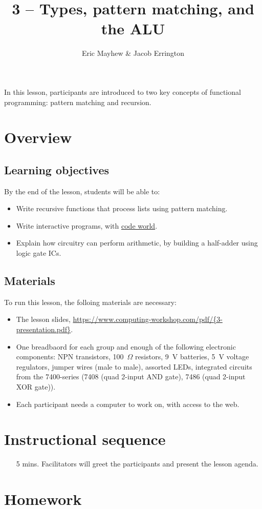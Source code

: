 \documentclass[11pt]{article}
\title{3 -- Types, pattern matching, and the ALU}
\author{Eric Mayhew \& Jacob Errington}
\date{}
\newcommand{\cwurl}{https://www.computing-workshop.com/}
\newcommand{\cwpdf}{\cwurl pdf/}
\newcommand{\codeworld}{\href{http://code.world/}{code world}}
\begin{document}
\maketitle

In this lesson, participants are introduced to two key concepts of functional
programming: pattern matching and recursion.

\section*{Overview}

\subsection*{Learning objectives}

By the end of the lesson, students will be able to:
%
\begin{itemize}
\item Write recursive functions that process lists using pattern matching.
\item Write interactive programs, with \codeworld.
\item Explain how circuitry can perform arithmetic, by building a half-adder
  using logic gate ICs.
\end{itemize}

\subsection*{Materials}

To run this lesson, the folloing materials are necessary:

\begin{itemize}
\item The lesson slides, \url{\cwpdf{3-presentation.pdf}}.
\item One breadbaord for each group and enough of the following electronic
  components:
  NPN transistors,
  100~$\Omega$ resistors,
  9~V batteries,
  5~V voltage regulators,
  jumper wires (male to male),
  assorted LEDs,
  integrated circuits from the 7400-series (7408 (quad 2-input AND gate), 7486
  (quad 2-input XOR gate)).
\item Each participant needs a computer to work on, with access to the web.
\end{itemize}

\section*{Instructional sequence}

\begin{itemize}
\item[5 mins.]
  Facilitators will greet the participants and present the lesson agenda.
\end{itemize}

\section*{Homework}
\end{document}
